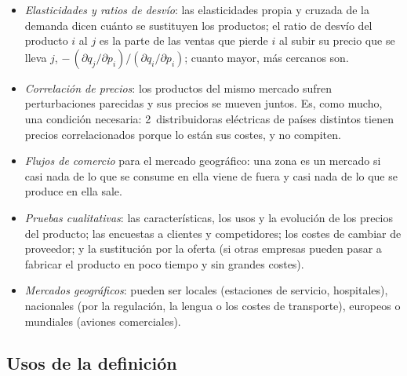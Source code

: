 \documentclass[11pt]{article}
\begin{document}
\begin{itemize}
\item \emph{Elasticidades y ratios de desvío}: las elasticidades propia y cruzada de la demanda dicen cuánto se sustituyen los productos; el ratio de desvío del producto $i$ al $j$ es la parte de las ventas que pierde $i$ al subir su precio que se lleva $j$, $-\,(\partial q_j/\partial p_i)/(\partial q_i/\partial p_i)$; cuanto mayor, más cercanos son.
\item \emph{Correlación de precios}: los productos del mismo mercado sufren perturbaciones parecidas y sus precios se mueven juntos\nocite{StiglerSherwin1985Extent}. Es, como mucho, una condición necesaria: 2~distribuidoras eléctricas de países distintos tienen precios correlacionados porque lo están sus costes, y no compiten.
\item \emph{Flujos de comercio} para el mercado geográfico\nocite{ElzingaHogarty1973Problem}: una zona es un mercado si casi nada de lo que se consume en ella viene de fuera y casi nada de lo que se produce en ella sale.
\item \emph{Pruebas cualitativas}: las características, los usos y la evolución de los precios del producto; las encuestas a clientes y competidores; los costes de cambiar de proveedor; y la sustitución por la oferta (si otras empresas pueden pasar a fabricar el producto en poco tiempo y sin grandes costes).
\item \emph{Mercados geográficos}: pueden ser locales (estaciones de servicio, hospitales), nacionales (por la regulación, la lengua o los costes de transporte), europeos o mundiales (aviones comerciales).
\end{itemize}

\subsection{Usos de la definición}\label{anexo:usos-mercado}
\end{document}
